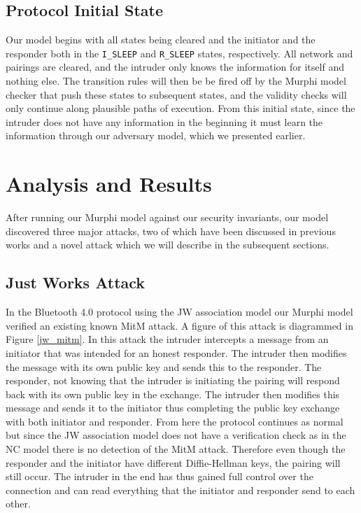 \documentclass{acm_proc_article-sp}
\begin{document}
\subsection{Protocol Initial State}
Our model begins with all states being cleared and the initiator and the responder both in the \texttt{I\_SLEEP} and \texttt{R\_SLEEP} states, respectively. All network and pairings are cleared, and the intruder only knows the information for itself and nothing else. The transition rules will then be be fired off by the Murphi model checker that push these states to subsequent states, and the validity checks will only continue along plausible paths of execution. From this initial state, since the intruder does not have any information in the beginning it must learn the information through our adversary model, which we presented earlier.

\section{Analysis and Results}

After running our Murphi model against our security invariants, our model discovered three major attacks, two of which have been discussed in previous works \cite{phan:mingard} and a novel attack which we will describe in the subsequent sections. 

\subsection{Just Works Attack}
In the Bluetooth 4.0 protocol using the JW association model our Murphi model verified an existing known MitM attack. A figure of this attack is diagrammed in Figure \ref{jw_mitm}. In this attack the intruder intercepts a message from an initiator that was intended for an honest responder. The intruder then modifies the message with its own public key and sends this to the responder. The responder, not knowing that the intruder is initiating the pairing will respond back with its own public key in the exchange. The intruder then modifies this message and sends it to the initiator thus completing the public key exchange with both initiator and responder. From here the protocol continues as normal but since the JW association model does not have a verification check as in the NC model there is no detection of the MitM attack. Therefore even though the responder and the initiator have different Diffie-Hellman keys, the pairing will still occur. The intruder in the end has thus gained full control over the connection and can read everything that the initiator and responder send to each other.
\end{document}
